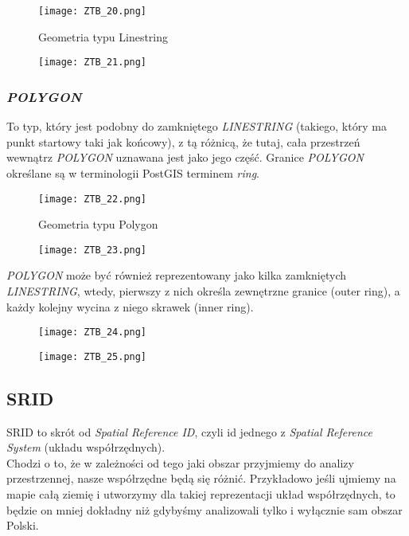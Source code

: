 \documentclass[a4paper,15pt]{article}
\newcommand{\example}[2]{
    \begin{tcolorbox}[colback=blue!5!white,colframe=blue,title={Przykład #1}]
        #2
    \end{tcolorbox}
}
\begin{document}
\begin{figure}[H]
\centering
  \texttt{[image: ZTB\_20.png]}
  \caption{Geometria typu Linestring}
\end{figure}

\example{- \textit{LINESTRING}}{
\begin{figure}[H]
\centering
  \texttt{[image: ZTB\_21.png]}
\end{figure}
}


\subsubsection{\textit{POLYGON}}

To typ, który jest podobny do zamkniętego \textit{LINESTRING} (takiego, który ma punkt startowy taki jak końcowy), z tą różnicą, że tutaj, cała przestrzeń wewnątrz \textit{POLYGON} uznawana jest jako jego część. Granice \textit{POLYGON} określane są w terminologii PostGIS terminem \textit{ring}. 

\begin{figure}[H]
\centering
  \texttt{[image: ZTB\_22.png]}
  \caption{Geometria typu Polygon}
\end{figure}

\example{- \textit{POLYGON}}{
\begin{figure}[H]
\centering
  \texttt{[image: ZTB\_23.png]}
\end{figure}
}

\textit{POLYGON} może być również reprezentowany jako kilka zamkniętych \textit{LINESTRING}, wtedy, pierwszy z nich określa zewnętrzne granice (outer ring), a każdy kolejny wycina z niego skrawek (inner ring).

\example{- \textit{POLYGON}}{
\begin{figure}[H]
\centering
  \texttt{[image: ZTB\_24.png]}
\end{figure}
\begin{figure}[H]
\centering
  \texttt{[image: ZTB\_25.png]}
\end{figure}
}

\subsection{SRID}
SRID to skrót od \textit{Spatial Reference ID}, czyli id jednego z \textit{Spatial Reference System} (układu współrzędnych). \\

Chodzi o to, że w zależności od tego jaki obszar przyjmiemy do analizy przestrzennej, nasze współrzędne będą się różnić. Przykładowo jeśli ujmiemy na mapie całą ziemię i utworzymy dla takiej reprezentacji układ współrzędnych, to będzie on mniej dokładny niż gdybyśmy analizowali tylko i wyłącznie sam obszar Polski. \\
\end{document}
